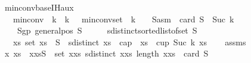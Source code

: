 \begin{isabellebody}
\isamarkupfalse%
%
\endisatagproof
{\isafoldproof}%
%
\isadelimproof
\isanewline
%
\endisadelimproof
\isanewline
{}\isamarkupfalse%
\ min{\isacharunderscore}{\kern0pt}conv{\isacharunderscore}{\kern0pt}base{\isacharunderscore}{\kern0pt}IH{\isacharunderscore}{\kern0pt}aux{\isacharcolon}{\kern0pt}\isanewline
\ \ \ {\isachardoublequoteopen}min{\isacharunderscore}{\kern0pt}conv\ {}\ k\ {\isacharequal}{\kern0pt}\ k{\isachardoublequoteclose}\ \ \ {\isachardoublequoteopen}min{\isacharunderscore}{\kern0pt}conv{\isacharunderscore}{\kern0pt}set\ {}\ k\ {\isasymnoteq}\ {\isacharbraceleft}{\kern0pt}{\isacharbraceright}{\kern0pt}{\isachardoublequoteclose}\ \ S{\isacharunderscore}{\kern0pt}asm{\isacharcolon}{\kern0pt}\ \ {\isachardoublequoteopen}card\ S\ {\isacharequal}{\kern0pt}\ Suc\ k{\isachardoublequoteclose}\ \ \isanewline
\ \ \ \ S{\isacharunderscore}{\kern0pt}gp{\isacharcolon}{\kern0pt}\ {\isachardoublequoteopen}general{\isacharunderscore}{\kern0pt}pos\ S{\isachardoublequoteclose}\ \ \ \ \ \ {\isachardoublequoteopen}sdistinct{\isacharparenleft}{\kern0pt}sorted{\isacharunderscore}{\kern0pt}list{\isacharunderscore}{\kern0pt}of{\isacharunderscore}{\kern0pt}set\ S{\isacharparenright}{\kern0pt}{\isachardoublequoteclose}\isanewline
\ \ \ {\isachardoublequoteopen}{\isasymexists}xs{\isachardot}{\kern0pt}\ set\ xs\ {\isasymsubseteq}\ S\ {\isasymand}\ sdistinct\ xs\ {\isasymand}\ {\isacharparenleft}{\kern0pt}cap\ {}\ xs\ {\isasymor}\ cup\ {\isacharparenleft}{\kern0pt}Suc\ k{\isacharparenright}{\kern0pt}\ xs{\isacharparenright}{\kern0pt}{\isachardoublequoteclose}\isanewline
%
\isadelimproof
\ \ %
\endisadelimproof
%
\isatagproof
{}\isamarkupfalse%
\ assms\isanewline
{}\isamarkupfalse%
{\isacharminus}{\kern0pt}\isanewline
\ \ \isamarkupfalse%
\ x\ xs\ \ x{\isacharunderscore}{\kern0pt}xs{\isacharcolon}{\kern0pt}{\isachardoublequoteopen}S\ {\isacharequal}{\kern0pt}\ set\ {\isacharparenleft}{\kern0pt}x{\isacharhash}{\kern0pt}xs{\isacharparenright}{\kern0pt}{\isachardoublequoteclose}\ {\isachardoublequoteopen}sdistinct\ {\isacharparenleft}{\kern0pt}x{\isacharhash}{\kern0pt}xs{\isacharparenright}{\kern0pt}{\isachardoublequoteclose}\ {\isachardoublequoteopen}length\ {\isacharparenleft}{\kern0pt}x{\isacharhash}{\kern0pt}xs{\isacharparenright}{\kern0pt}\ {\isacharequal}{\kern0pt}\ card\ S{\isachardoublequoteclose}\isanewline

\end{isabellebody}
